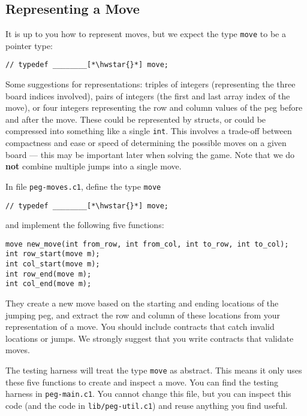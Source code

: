 \documentclass[12pt]{exam}
\begin{document}
\subsection{Representing a Move}

It is up to you how to represent moves, but we expect the type
\lstinline'move' to be a pointer type:
\newcommand{\hwstar}{\commentstyle{*}}
\begin{lstlisting}
// typedef ________[*\hwstar{}*] move;
\end{lstlisting}
Some suggestions for representations: triples of integers
(representing the three board indices involved), pairs of integers
(the first and last array index of the move), or four integers
representing the row and column values of the peg before and after the
move.  These could be represented by structs, or could be compressed
into something like a single \lstinline'int'.  This involves a
trade-off between compactness and ease or speed of determining the
possible moves on a given board --- this may be important later when
solving the game.  Note that we do \textbf{not} combine multiple jumps
into a single move.

\begin{task}[3]
In file \lstinline'peg-moves.c1', define the type \lstinline'move'
\begin{lstlisting}
// typedef ________[*\hwstar{}*] move;
\end{lstlisting}
and implement the following five functions:
\begin{lstlisting}
move new_move(int from_row, int from_col, int to_row, int to_col);
int row_start(move m);
int col_start(move m);
int row_end(move m);
int col_end(move m);
\end{lstlisting}
They create a new move based on the starting and ending locations of
the jumping peg, and extract the row and column of these locations
from your representation of a move.  You should include contracts that
catch invalid locations or jumps.  We strongly suggest that you write
contracts that validate moves.
\end{task}

The testing harness will treat the type \lstinline'move' as abstract.
This means it only uses these five functions to create and inspect a
move.  You can find the testing harness in
\lstinline'peg-main.c1'. You cannot change this file, but you can
inspect this code (and the code in \lstinline'lib/peg-util.c1') and
reuse anything you find useful.
\end{document}
